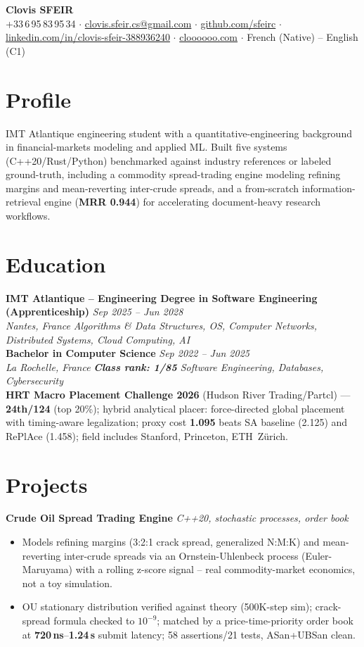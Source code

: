 \documentclass[10pt]{article}
\newcommand{\entry}[4]{%
  \noindent\textbf{#1} \hfill \textit{#2} \\
  \textit{#3} \hfill \textit{#4}\\[-0.3em]
}
\newcommand{\projectentry}[2]{%
  \noindent\textbf{#1} \hfill \textit{#2}\\[-0.3em]
}
\begin{document}
\fontsize{9.3pt}{11pt}\selectfont
\begin{center}
  {\LARGE \textbf{Clovis SFEIR}}\\[0.3em]
  +33\,6\,95\,83\,95\,34 \;$\cdot$\; \href{mailto:clovis.sfeir.cs@gmail.com}{clovis.sfeir.cs@gmail.com} \;$\cdot$\;
  \href{https://github.com/sfeirc}{github.com/sfeirc} \;$\cdot$\;
  \href{https://linkedin.com/in/clovis-sfeir-388936240}{linkedin.com/in/clovis-sfeir-388936240} \;$\cdot$\;
  \href{https://cloooooo.com}{cloooooo.com} \;$\cdot$\; French (Native) -- English (C1)
\end{center}

\section*{Profile}
IMT Atlantique engineering student with a quantitative-engineering background in financial-markets modeling and applied ML. Built five systems (C++20/Rust/Python) benchmarked against industry references or labeled ground-truth, including a commodity spread-trading engine modeling refining margins and mean-reverting inter-crude spreads, and a from-scratch information-retrieval engine (\textbf{MRR 0.944}) for accelerating document-heavy research workflows.

\section*{Education}
\entry{IMT Atlantique -- Engineering Degree in Software Engineering (Apprenticeship)}{Sep 2025 -- Jun 2028}{Nantes, France}{Algorithms \& Data Structures, OS, Computer Networks, Distributed Systems, Cloud Computing, AI}
\entry{Bachelor in Computer Science}{Sep 2022 -- Jun 2025}{La Rochelle, France}{\textbf{Class rank: 1/85} \textbar{} Software Engineering, Databases, Cybersecurity}
\noindent\textbf{HRT Macro Placement Challenge 2026} (Hudson River Trading/Partcl) --- \textbf{24th/124} (top 20\%); hybrid analytical placer: force-directed global placement with timing-aware legalization; proxy cost \textbf{1.095} beats SA baseline (2.125) and RePlAce (1.458); field includes Stanford, Princeton, ETH~Z\"urich.

\section*{Projects}

\projectentry{Crude Oil Spread Trading Engine}{C++20, stochastic processes, order book}
\begin{itemize}
  \item Models refining margins (3:2:1 crack spread, generalized N:M:K) and mean-reverting inter-crude spreads via an Ornstein-Uhlenbeck process (Euler-Maruyama) with a rolling z-score signal -- real commodity-market economics, not a toy simulation.
  \item OU stationary distribution verified against theory (500K-step sim); crack-spread formula checked to $10^{-9}$; matched by a price-time-priority order book at \textbf{720\,ns}--\textbf{1.24\,\textmu s} submit latency; 58 assertions/21 tests, ASan+UBSan clean.
\end{itemize}
\end{document}
